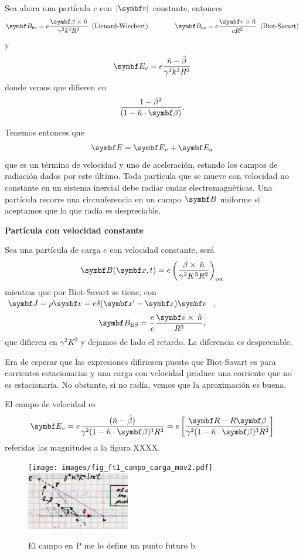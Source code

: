 \documentclass[10pt,oneside]{CBFT_book}
\begin{document}
Sea ahora una partícula $e$ con $|\vb{v}|$ constante, entonces 
\[
	\vb{B}_{bs} = e\frac{\vb{\beta}\times\hat{n}}{\gamma^2k^3R^2} \;\; \text{(Lienard-Wiechert)}
	\qquad \qquad 
	\vb{B}_{bs} = e\frac{\vb{v}\times\hat{n}}{cR^2} \;\; \text{(Biot-Savart)}
\]
y 
\[
	\vb{E}_{v} = e\frac{ \hat{n}- \hat{\beta} }{\gamma^2k^3R^2}
\]
donde vemos que difieren en 
\[
	\frac{1-\beta^2}{(1-\hat{n}\cdot{\vb{\beta}})}.
\]

Tenemos entonces que
\[
	\vb{E}  = \vb{E}_v  + \vb{E}_a 
\]
que es un término de velocidad y uno de aceleración, estando los campos de radiación dados por
este último.
Toda partícula que se mueve con velocidad no constante en un sistema inercial debe radiar ondas
electromagnéticas.
Una partícula recorre una circunferencia en un campo $\vb B$ uniforme si aceptamos que lo que radía
es despreciable.

\begin{ejemplo}{\bf Partícula con velocidad constante}

Sea una partícula de carga $e$ con velocidad constante, será
\[
	\vb{B}(\vbx,t) = e \Frac{\beta\times\nver}{\gamma^2K^3R^2}_\text{ret}
\]
mientras que por Biot-Savart se tiene, con $\vb J = \rho \vb v = e \delta(\vbx'-\vbx)\vb v$ ,
\[
	\vb{B}_\text{BS} = \frac{e}{c} \frac{\vb v \times \nver }{R^3},
\]
que difieren en $\gamma^2K^3$ y dejamos de lado el retardo. La diferencia es despreciable.

Era de esperar que las expresiones difiriesen puesto que Biot-Savart es para corrientes
estacionarias y una carga con velocidad produce una corriente que no es estacionaria.
No obstante, si no radía, vemos que la aproximación es buena.
 
\end{ejemplo}


El campo de velocidad es 
\[
	\vb{E}_v = e \frac{(\hat{n}-\hat{\beta})}{\gamma^2(1-\hat{n}\cdot\vb{\beta})^3R^2} =
		e \left[ \frac{\vb{R}-R\vb{\beta}}{\gamma^2(1-\hat{n}\cdot\vb{\beta})^3R^2} \right]
\]
referidas las magnitudes a la figura XXXX.

\begin{figure}[htb]
	\begin{center}
	\texttt{[image: images/fig\_ft1\_campo\_carga\_mov2.pdf]}
	\includegraphics[width=0.4\textwidth]{images/fig_ft1_campo_carga_mov2JPG.jpg}
	\end{center}
	\caption{El campo en P me lo define un punto futuro b.}
\end{figure} 
\end{document}
